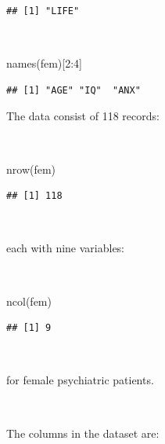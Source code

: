 \documentclass[
  12pt,
]{book}
\newenvironment{Shaded}{\begin{snugshade}}{\end{snugshade}}
\newcommand{\DecValTok}[1]{\textcolor[rgb]{0.00,0.00,0.81}{#1}}
\newcommand{\FunctionTok}[1]{\textcolor[rgb]{0.00,0.00,0.00}{#1}}
\newcommand{\NormalTok}[1]{#1}
\newcommand{\SpecialCharTok}[1]{\textcolor[rgb]{0.00,0.00,0.00}{#1}}
\begin{document}
\begin{verbatim}
## [1] "LIFE"
\end{verbatim}

~

\begin{Shaded}
\begin{Highlighting}[]
\FunctionTok{names}\NormalTok{(fem)[}\DecValTok{2}\SpecialCharTok{:}\DecValTok{4}\NormalTok{]}
\end{Highlighting}
\end{Shaded}

\begin{verbatim}
## [1] "AGE" "IQ"  "ANX"
\end{verbatim}

\newpage

The data consist of 118 records:

~

\begin{Shaded}
\begin{Highlighting}[]
\FunctionTok{nrow}\NormalTok{(fem)}
\end{Highlighting}
\end{Shaded}

\begin{verbatim}
## [1] 118
\end{verbatim}

~

each with nine variables:

~

\begin{Shaded}
\begin{Highlighting}[]
\FunctionTok{ncol}\NormalTok{(fem)}
\end{Highlighting}
\end{Shaded}

\begin{verbatim}
## [1] 9
\end{verbatim}

~

for female psychiatric patients.

~

The columns in the dataset are:

~
\end{document}
